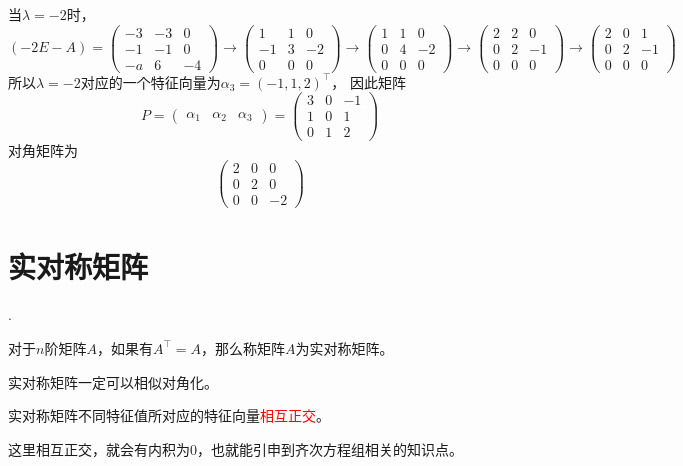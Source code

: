 \begin{solution}
    当$\lambda=-2$时，
    \[
        (-2E-A) =
        \begin{pmatrix}
            -3 & -3 & 0  \\
            -1 & -1 & 0  \\
            -a & 6  & -4
        \end{pmatrix}
        \longrightarrow
        \begin{pmatrix}
            1  & 1 & 0  \\
            -1 & 3 & -2 \\
            0  & 0 & 0
        \end{pmatrix}
        \longrightarrow
        \begin{pmatrix}
            1 & 1 & 0  \\
            0 & 4 & -2 \\
            0 & 0 & 0
        \end{pmatrix}
        \longrightarrow
        \begin{pmatrix}
            2 & 2 & 0  \\
            0 & 2 & -1 \\
            0 & 0 & 0
        \end{pmatrix}
        \longrightarrow
        \begin{pmatrix}
            2 & 0 & 1  \\
            0 & 2 & -1 \\
            0 & 0 & 0
        \end{pmatrix}
    \]
    所以$\lambda=-2$对应的一个特征向量为$\alpha_3 = (-1,1,2)^\intercal$，
    因此矩阵
    \[
        P =
        \begin{pmatrix}
            \alpha_1 & \alpha_2 & \alpha_3
        \end{pmatrix}
        =
        \begin{pmatrix}
            3 & 0 & -1 \\
            1 & 0 & 1  \\
            0 & 1 & 2
        \end{pmatrix}
    \]
    对角矩阵为
    \[
        \begin{pmatrix}
            2 & 0 & 0  \\
            0 & 2 & 0  \\
            0 & 0 & -2
        \end{pmatrix}
    \]
\end{solution}

\section{实对称矩阵}
.
\begin{definition}
    对于$n$阶矩阵$A$，如果有$A^\intercal = A$，那么称矩阵$A$为实对称矩阵。
\end{definition}
\begin{theorem}
    实对称矩阵一定可以相似对角化。
\end{theorem}
\begin{theorem}
    实对称矩阵不同特征值所对应的特征向量\textcolor{red}{相互正交}。
\end{theorem}
这里相互正交，就会有内积为$0$，也就能引申到齐次方程组相关的知识点。

